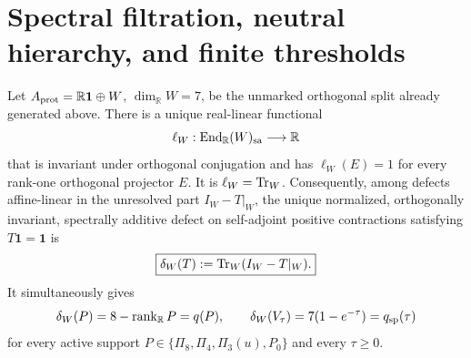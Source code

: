 \documentclass[12pt,a4paper]{article}
\begin{document}
\section{Spectral filtration, neutral hierarchy, and finite thresholds}
\label{p3c:sec:v196-filtration}
\begin{theorem}
\label{p3c:thm:common-trace-defect-spectral-filtration}
Let
\(A_{\rm prot}=\mathbb R\mathbf1\oplus W\), \(\dim_{\mathbb R}W=7\), be the
unmarked orthogonal split already generated above.  There is a unique
real-linear functional
\[
 \ell_W:\operatorname{End}_{\mathbb R}(W)_{\rm sa}\longrightarrow\mathbb R
\]
that is invariant under orthogonal conjugation and has
\(\ell_W(E)=1\) for every rank-one orthogonal projector \(E\).  It is
\(\ell_W=\operatorname{Tr}_W\).  Consequently, among defects affine-linear in the
unresolved part \(I_W-T|_W\), the unique normalized, orthogonally invariant,
spectrally additive defect on self-adjoint positive contractions satisfying
\(T\mathbf1=\mathbf1\) is
\begin{equation}
\label{p3c:eq:common-trace-defect}
 \boxed{\delta_W(T):=\operatorname{Tr}_W(I_W-T|_W).}
\end{equation}
It simultaneously gives
\begin{equation}
\label{p3c:eq:trace-defect-two-restrictions}
 \delta_W(P)=8-\operatorname{rank}_{\mathbb R}P=q(P),
 \qquad
 \delta_W(V_\tau)=7(1-e^{-\tau})=q_{\rm sp}(\tau)
\end{equation}
for every active support
\(P\in\{\Pi_8,\Pi_4,\Pi_3(u),P_0\}\) and every \(\tau\ge0\).


\end{theorem}
\end{document}
